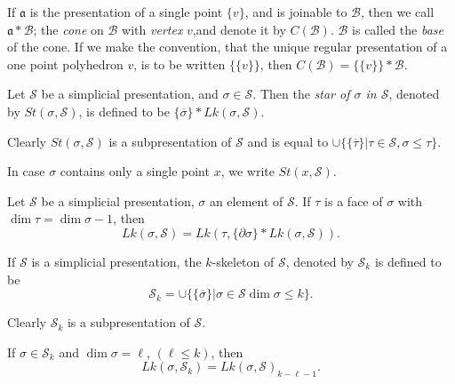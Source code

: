 If $\mathfrak{a}$ is the presentation of a single point $\{v\}$, and is joinable to $\mathscr{B}$, then we call $\mathfrak{a}\ast\mathscr{B}$; the {\em cone} on $\mathscr{B}$ with {\em vertex} $v$,\pageoriginale and denote it by $C(\mathscr{B})$. $\mathscr{B}$ is called the {\em base} of the cone. If we make the convention, that the unique regular presentation of a one point polyhedron $v$, is to be written $\{\{v\}\}$, then $C(\mathscr{B})=\{\{v\}\}\ast\mathscr{B}$.

\begin{definition}\label{chap4-defi4.1.12}
Let $\mathscr{S}$ be a simplicial presentation, and $\sigma\in \mathscr{S}$. Then the {\em star of $\sigma$ in $\mathscr{S}$}, denoted by $St(\sigma,\mathscr{S})$, is defined to be $\{\overline{\sigma}\}\ast Lk(\sigma,\mathscr{S})$.
\end{definition}

Clearly $St(\sigma,\mathscr{S})$ is a subpresentation of $\mathscr{S}$ and is equal to $\cup \{\{\overline{\tau}\}|\tau\in\mathscr{S},\sigma\leq \tau\}$.

In case $\sigma$ contains only a single point $x$, we write $St(x,\mathscr{S})$.

\begin{ex}\label{chap4-ex4.1.13}
Let $\mathscr{S}$ be a simplicial presentation, $\sigma$ an element of $\mathscr{S}$. If $\tau$ is a face of $\sigma$ with $\dim \tau=\dim\sigma-1$, then
$$
Lk(\sigma,\mathscr{S})=Lk(\tau,\{\partial\sigma\}\ast Lk(\sigma,\mathscr{S})).
$$
\end{ex}

\begin{definition}\label{chap4-defi4.1.14}
If $\mathscr{S}$ is a simplicial presentation, the $k$-skeleton of $\mathscr{S}$, denoted by $\mathscr{S}_{k}$ is defined to be
$$
\mathscr{S}_{k}=\cup \{\{\overline{\sigma}\}|\sigma\in\mathscr{S}\dim \sigma\leq k\}.
$$
\end{definition}

Clearly $\mathscr{S}_{k}$ is a subpresentation of $\mathscr{S}$.

\begin{ex}\label{chap4-ex4.1.15}
If $\sigma\in \mathscr{S}_{k}$ and $\dim \sigma=\ell$, $(\ell\leq k)$, then
$$
Lk(\sigma,\mathscr{S}_{k})=Lk(\sigma,\mathscr{S})_{k-\ell-1}.
$$
\end{ex}


